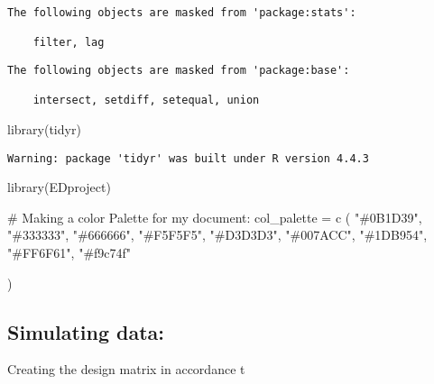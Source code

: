 \documentclass[
  11pt,
  letterpaper,
  DIV=11,
  numbers=noendperiod]{scrartcl}
\newenvironment{Shaded}{}{}
\newcommand{\CommentTok}[1]{\textcolor[rgb]{0.54,0.53,0.53}{#1}}
\newcommand{\FunctionTok}[1]{\textcolor[rgb]{0.39,0.29,0.61}{#1}}
\newcommand{\NormalTok}[1]{\textcolor[rgb]{0.12,0.11,0.11}{#1}}
\newcommand{\OtherTok}[1]{\textcolor[rgb]{0.00,0.43,0.16}{#1}}
\newcommand{\StringTok}[1]{\textcolor[rgb]{0.75,0.01,0.01}{#1}}
\begin{document}
\begin{verbatim}
The following objects are masked from 'package:stats':

    filter, lag
\end{verbatim}

\begin{verbatim}
The following objects are masked from 'package:base':

    intersect, setdiff, setequal, union
\end{verbatim}

\begin{Shaded}
\begin{Highlighting}[numbers=left,,]
\FunctionTok{library}\NormalTok{(tidyr)}
\end{Highlighting}
\end{Shaded}

\begin{verbatim}
Warning: package 'tidyr' was built under R version 4.4.3
\end{verbatim}

\begin{Shaded}
\begin{Highlighting}[numbers=left,,]
\FunctionTok{library}\NormalTok{(EDproject)}

\CommentTok{\# Making a color Palette for my document: }
\NormalTok{col\_palette }\OtherTok{=} \FunctionTok{c}\NormalTok{ (}
  \StringTok{"\#0B1D39"}\NormalTok{,}
  \StringTok{"\#333333"}\NormalTok{,}
  \StringTok{"\#666666"}\NormalTok{, }
  \StringTok{"\#F5F5F5"}\NormalTok{, }
  \StringTok{"\#D3D3D3"}\NormalTok{,}
  \StringTok{"\#007ACC"}\NormalTok{,}
  \StringTok{"\#1DB954"}\NormalTok{,}
  \StringTok{"\#FF6F61"}\NormalTok{,}
  \StringTok{"\#f9c74f"}
  
\NormalTok{)}
\end{Highlighting}
\end{Shaded}

\subsection{Simulating data:}\label{simulating-data}

Creating the design matrix in accordance t
\end{document}

